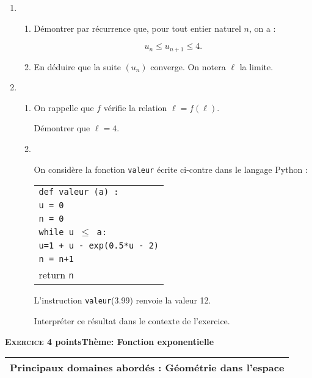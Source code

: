 \documentclass[11pt,a4paper,french]{article}
\begin{document}
\begin{enumerate}
\item 
	\begin{enumerate}
		\item Démontrer par récurrence que, pour tout entier naturel $n$, on a : 
		
		\[u_n \leqslant u_{n+1} \leqslant 4.\]
		
		\item En déduire que la suite $\left(u_n\right)$ converge. On notera $\ell$ la limite.
	\end{enumerate}	
\item 
	\begin{enumerate}
		\item On rappelle que $f$ vérifie la relation $\ell = f(\ell)$.
		
Démontrer que $\ell  = 4$.
		\item ~
		
\begin{minipage}{0.48\linewidth}On considère la fonction \texttt{valeur} écrite ci-contre dans le langage Python :
		\end{minipage}\hfill 
\begin{minipage}{0.48\linewidth}
\begin{tabular}{|l|}\hline
\texttt{def valeur (a) :}\\
\quad \texttt{u = 0}\\
\quad \texttt{n = 0}\\
\quad \texttt{while u $\leqslant$ a:}\\
\qquad \texttt{u=1 + u - exp(0.5*u - 2)}\\
\qquad \texttt{n = n+1}\\ 
\quad return \texttt{n}\\ \hline
\end{tabular}
\end{minipage}

L'instruction \texttt{valeur}(3.99) renvoie la valeur 12.

Interpréter ce résultat dans le contexte de l'exercice.
	\end{enumerate}
\end{enumerate}

\bigskip

\textbf{\textsc{Exercice 4}  points\hfill Thème: Fonction exponentielle }

\medskip

\begin{tabularx}{\linewidth}{|X|}\hline
\textbf{Principaux domaines abordés :} Géométrie dans l'espace\\ \hline
\end{tabularx}
\end{document}
